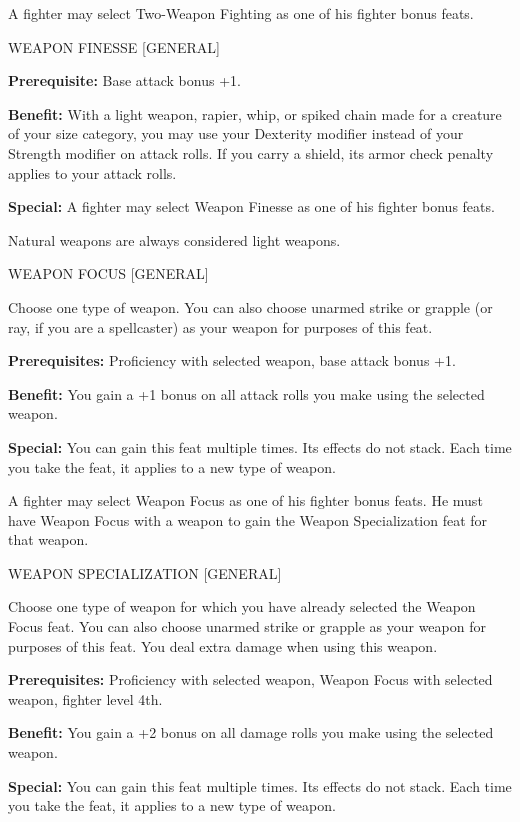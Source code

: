 \documentclass{article}
\begin{document}
A fighter may select Two-Weapon Fighting as one of his fighter bonus feats.

\vspace{12pt}
WEAPON FINESSE [GENERAL]

\textbf{Prerequisite:} Base attack bonus +1.

\textbf{Benefit:} With a light weapon, rapier, whip, or spiked chain made for a 
creature of your size category, you may use your Dexterity modifier instead of 
your Strength modifier on attack rolls. If you carry a shield, its armor check 
penalty applies to your attack rolls.

\textbf{Special:} A fighter may select Weapon Finesse as one of his fighter bonus 
feats.

Natural weapons are always considered light weapons.

\vspace{12pt}
WEAPON FOCUS [GENERAL]

Choose one type of weapon. You can also choose unarmed strike or grapple (or ray, 
if you are a spellcaster) as your weapon for purposes of this feat. 

\parindent=3pt
\textbf{Prerequisites:} Proficiency with selected weapon, base attack bonus +1.

\parindent=0pt
\textbf{Benefit:} You gain a +1 bonus on all attack rolls you make using the selected 
weapon.

\textbf{Special:} You can gain this feat multiple times. Its effects do not stack. 
Each time you take the feat, it applies to a new type of weapon.

A fighter may select Weapon Focus as one of his fighter bonus feats. He must have 
Weapon Focus with a weapon to gain the Weapon Specialization feat for that weapon.

\vspace{12pt}
WEAPON SPECIALIZATION [GENERAL]

Choose one type of weapon for which you have already selected the Weapon Focus 
feat. You can also choose unarmed strike or grapple as your weapon for purposes 
of this feat. You deal extra damage when using this weapon. 

\parindent=3pt
\textbf{Prerequisites:} Proficiency with selected weapon, Weapon Focus with selected 
weapon, fighter level 4th.

\parindent=0pt
\textbf{Benefit:} You gain a +2 bonus on all damage rolls you make using the selected 
weapon.

\textbf{Special:} You can gain this feat multiple times. Its effects do not stack. 
Each time you take the feat, it applies to a new type of weapon.
\end{document}
